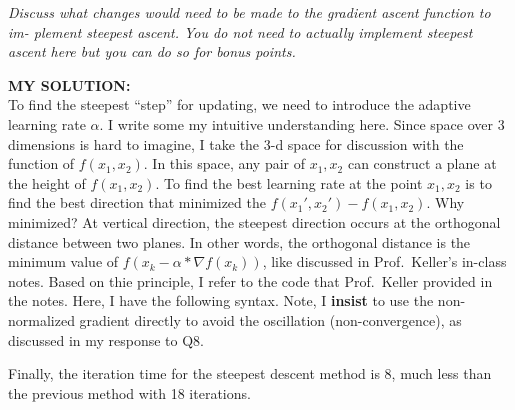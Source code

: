 \documentclass[
]{article}
\begin{document}
\emph{Discuss what changes would need to be made to the gradient ascent
function to im- plement steepest ascent. You do not need to actually
implement steepest ascent here but you can do so for bonus points.}

\textbf{MY SOLUTION:}\\
To find the steepest ``step'' for updating, we need to introduce the
adaptive learning rate \(\alpha\). I write some my intuitive
understanding here. Since space over 3 dimensions is hard to imagine, I
take the 3-d space for discussion with the function of \(f(x_1,x_2)\).
In this space, any pair of \(x_1, x_2\) can construct a plane at the
height of \(f(x_1,x_2)\). To find the best learning rate at the point
\(x_1, x_2\) is to find the best direction that minimized the
\(f(x_1',x_2')-f(x_1,x_2)\). Why minimized? At vertical direction, the
steepest direction occurs at the orthogonal distance between two planes.
In other words, the orthogonal distance is the minimum value of
\(f(x_k-\alpha*\nabla f(x_k))\), like discussed in Prof.~Keller's
in-class notes. Based on thie principle, I refer to the code that
Prof.~Keller provided in the notes. Here, I have the following syntax.
Note, I \textbf{insist} to use the non-normalized gradient directly to
avoid the oscillation (non-convergence), as discussed in my response to
Q8.

Finally, the iteration time for the steepest descent method is 8, much
less than the previous method with 18 iterations.
\end{document}
